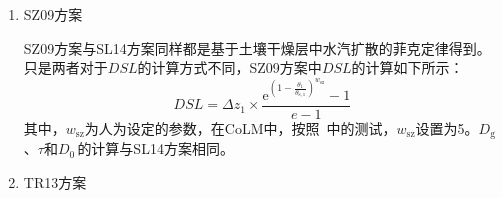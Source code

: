 \begin{enumerate}
  \item
    SZ09方案

    SZ09方案与SL14方案同样都是基于土壤干燥层中水汽扩散的菲克定律得到。只是两者对于\(DSL\)的计算方式不同，SZ09方案中\(DSL\)的计算如下所示：
    \begin{equation}
      DSL = \Delta z_{1} \times \frac{{\mathrm e}^{\left( 1 - \frac{\theta_{1}}{\theta_{\mathrm{s,1}}} \right)^{w_{\mathrm{sz}}}} - 1}{e - 1}\
    \end{equation}
    其中，\(w_{\mathrm{sz}}\)为人为设定的参数，在CoLM中，按照~\citet{sz2009}中的测试，\(w_{\mathrm{sz}}\)设置为5。\(D_{\mathrm{g}}\)、\(\tau\)和\(D_{0\ }\)的计算与SL14方案相同。

  \item
    TR13方案


\end{enumerate}
